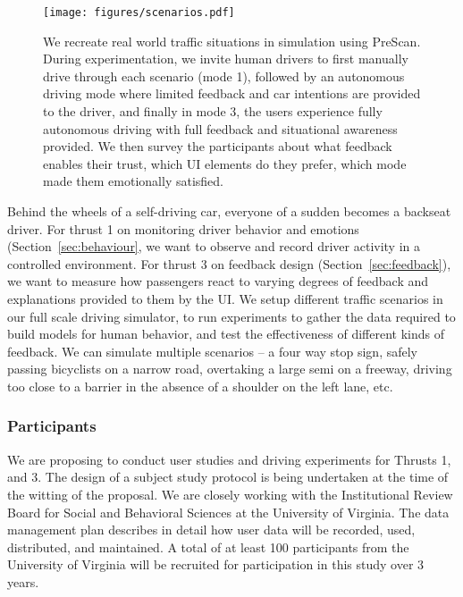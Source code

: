 \begin{figure}
    \centering
    \texttt{[image: figures/scenarios.pdf]}
    \caption{ We recreate real world traffic situations in simulation using PreScan. During experimentation, we invite human drivers to first manually drive through each scenario (mode 1), followed by an autonomous driving mode where limited feedback and car intentions are provided to the driver, and finally in mode 3, the users experience fully autonomous driving with full feedback and situational awareness provided. We then survey the participants about what feedback enables their trust, which UI elements do they prefer, which mode made them emotionally satisfied.  }
    \label{fig:scenario}
\end{figure}

Behind the wheels of a self-driving car, everyone of a sudden becomes a backseat driver. For thrust 1 on monitoring driver behavior and emotions (Section~\ref{sec:behaviour}, we want to observe and record driver activity in a controlled environment. 
For thrust 3 on feedback design (Section~\ref{sec:feedback}), we want to measure how passengers react to varying degrees of feedback and explanations provided to them by the UI. We setup different traffic scenarios in our full scale driving simulator, to run experiments to gather the data required to build models for human behavior, and test the effectiveness of different kinds of feedback. 
We can simulate multiple scenarios – a four way stop sign, safely passing bicyclists on a narrow road, overtaking a large semi on a freeway, driving too close to a barrier in the absence of a shoulder on the left lane, etc. 
\vspace{-5pt}
\subsubsection{Participants}
We are proposing to conduct user studies and driving experiments for Thrusts 1, and 3.
The design of a subject study protocol is being undertaken at the time of the witting of the proposal. 
We are closely working with the Institutional Review Board for Social and Behavioral Sciences at the University of Virginia. 
The data management plan describes in detail how user data will be recorded, used, distributed, and maintained. 
A total of at least 100 participants from the University of Virginia will be recruited for participation in this study over 3 years. 
\vspace{-5pt}
